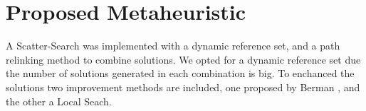 \section{Proposed Metaheuristic}
A Scatter-Search was implemented
with a dynamic reference set,
and a path relinking method
to combine solutions.
We opted for a dynamic reference set
due the number of solutions generated
in each combination is big.
To enchanced the solutions
two improvement methods are included,
one proposed by Berman \cite{berman1987stochastic},
and the other a Local Seach.


